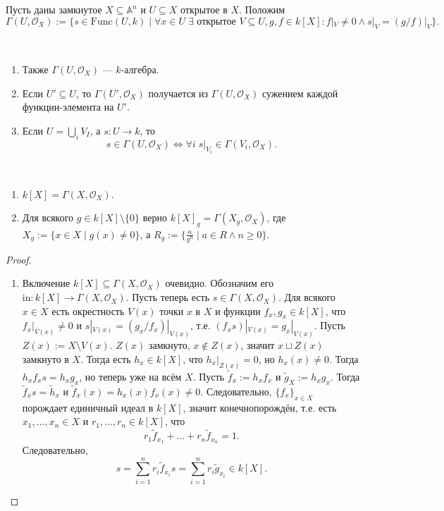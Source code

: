 \documentclass[12pt,a4paper]{article}
\renewcommand{\AA}{\ensuremath{\mathbb{A}}\xspace}
\newcommand{\Func}{\mathrm{Func}}
\newcommand{\incl}{\mathrm{in}}
\begin{document}
    Пусть даны замкнутое $X \subseteq \AA^n$ и $U \subseteq X$ открытое в $X$. Положим
    \[\Gamma(U, \mathcal{O}_X) := \{s \in \Func(U, k) \mid \forall x \in U \; \exists \text{ открытое } V \subseteq U, g, f \in k[X] \colon f|_V \neq 0 \wedge s|_V = (g/f)|_V\}.\]
    
    \begin{lemma}\ 
        \begin{enumerate}
            \item Также $\Gamma(U, \mathcal{O}_X)$ --- $k$-алгебра.
            \item Если $U' \subseteq U$, то $\Gamma(U', \mathcal{O}_X)$ получается из $\Gamma(U, \mathcal{O}_X)$ сужением каждой функции-элемента на $U'$.
            \item Если $U = \bigcup_i V_I$, а $s: U \to k$, то
                \[s \in \Gamma(U, \mathcal{O}_X) \Longleftrightarrow \forall i \; s|_{V_i} \in \Gamma(V_i, \mathcal{O}_X).\]
        \end{enumerate}
    \end{lemma}

    \begin{lemma}\ 
        \begin{enumerate}
            \item $k[X] = \Gamma(X, \mathcal{O}_X)$.
            \item Для всякого $g  \in k[X] \setminus \{0\}$ верно $k[X]_g = \Gamma(X_g, \mathcal{O}_X)$, где $X_g := \{x \in X \mid g(x) \neq 0\}$, а $R_g := \{\frac{a}{g^n} \mid a \in R \wedge n \geqslant 0\}$.
        \end{enumerate}
    \end{lemma}

    \begin{proof}
        \begin{enumerate}
            \item Включение $k[X] \subseteq \Gamma(X, \mathcal{O}_X)$ очевидно. Обозначим его $\incl: k[X] \to \Gamma(X, \mathcal{O}_X)$. Пусть теперь есть $s \in \Gamma(X, \mathcal{O}_X)$. Для всякого $x \in X$ есть окрестность $V(x)$ точки $x$ в $X$ и функции $f_x, g_x \in k[X]$, что $f_x|_{V(x)} \neq 0$ и $s|_{V(x)} = (g_x/f_x)|_{V(x)}$, т.е. $(f_x s)|_{V(x)} = g_x|_{V(x)}$. Пусть $Z(x) := X \setminus V(x)$. $Z(x)$ замкнуто, $x \notin Z(x)$, значит $x \sqcup Z(x)$ замкнуто в $X$. Тогда есть $h_x \in k[X]$, что $h_x|_{Z(x)} = 0$, но $h_x(x) \neq 0$. Тогда $h_x f_x s = h_x g_x$, но теперь уже на всём $X$. Пусть $\tilde{f}_x := h_x f_x$ и $\tilde{g}_X := h_x g_x$. Тогда $\tilde{f}_x s = \tilde{h}_x$ и $\tilde{f}_x(x) = h_x(x) f_x(x) \neq 0$. Следовательно, $\{f_x\}_{x \in X}$ порождает единичный идеал в $k[X]$, значит конечнопорождён, т.е. есть $x_1, \dots, x_n \in X$ и $r_1, \dots, r_n \in k[X]$, что
                \[r_1 \tilde{f}_{x_1} + \dots + r_n \tilde{f}_{x_n} = 1.\]
                Следовательно,
                \[s = \sum_{i=1}^n r_i \tilde{f}_{x_i} s = \sum_{i=1}^n r_i \tilde{g}_{x_i} \in k[X].\]
        \end{enumerate}
    \end{proof}
\end{document}
